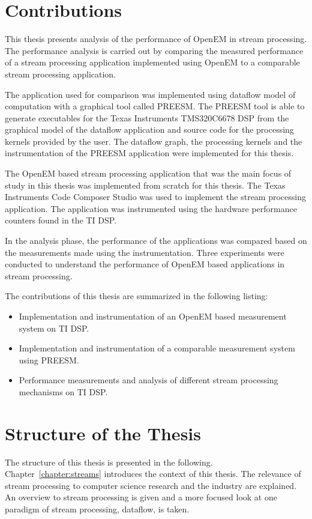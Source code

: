 \section{Contributions}
\label{section:contributions}
This thesis presents analysis of the performance of OpenEM in stream processing. The performance analysis is carried out by comparing the measured performance of a stream processing application implemented using OpenEM to a comparable stream processing application.

The application used for comparison was implemented using dataflow model of computation with a graphical tool called PREESM. The PREESM tool is able to generate executables for the Texas Instruments TMS320C6678 DSP from the graphical model of the dataflow application and source code for the processing kernels provided by the user. The dataflow graph, the processing kernels and the instrumentation of the PREESM application were implemented for this thesis.

The OpenEM based stream processing application that was the main focus of study in this thesis was implemented from scratch for this thesis. The Texas Instruments Code Composer Studio was used to implement the stream processing application. The application was instrumented using the hardware performance counters found in the TI DSP.

In the analysis phase, the performance of the applications was compared based on the measurements made using the instrumentation. Three experiments were conducted to understand the performance of OpenEM based applications in stream processing.

The contributions of this thesis are summarized in the following listing:
\begin{itemize}
    \item Implementation and instrumentation of an OpenEM based measurement system on TI DSP.
    \item Implementation and instrumentation of a comparable measurement system using PREESM.
    \item Performance measurements and analysis of different stream processing mechanisms on TI DSP.
\end{itemize}

\section{Structure of the Thesis}
\label{section:structure}
The structure of this thesis is presented in the following. Chapter~\ref{chapter:streams} introduces the context of this thesis. The relevance of stream processing to computer science research and the industry are explained. An overview to stream processing is given and a more focused look at one paradigm of stream processing, dataflow, is taken.

